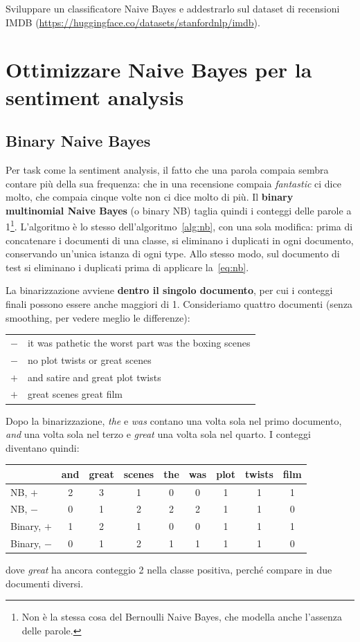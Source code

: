 \begin{esercizio}
Sviluppare un classificatore Naive Bayes e addestrarlo sul dataset di recensioni IMDB (\url{https://huggingface.co/datasets/stanfordnlp/imdb}).
\end{esercizio}

\section{Ottimizzare Naive Bayes per la sentiment analysis}
\subsection{Binary Naive Bayes}
Per task come la sentiment analysis, il fatto che una parola compaia sembra contare più della sua frequenza: che in una recensione compaia \textit{fantastic} ci dice molto, che compaia cinque volte non ci dice molto di più. Il \textbf{binary multinomial Naive Bayes} (o binary NB) taglia quindi i conteggi delle parole a 1\footnote{Non è la stessa cosa del Bernoulli Naive Bayes, che modella anche l'assenza delle parole.}. L'algoritmo è lo stesso dell'algoritmo~\ref{alg:nb}, con una sola modifica: prima di concatenare i documenti di una classe, si eliminano i duplicati in ogni documento, conservando un'unica istanza di ogni type. Allo stesso modo, sul documento di test si eliminano i duplicati prima di applicare la~\eqref{eq:nb}.

La binarizzazione avviene \textbf{dentro il singolo documento}, per cui i conteggi finali possono essere anche maggiori di 1. Consideriamo quattro documenti (senza smoothing, per vedere meglio le differenze):
\begin{center}
\begin{tabular}{cl}
$-$ & it was pathetic the worst part was the boxing scenes \\
$-$ & no plot twists or great scenes \\
$+$ & and satire and great plot twists \\
$+$ & great scenes great film \\
\end{tabular}
\end{center}
Dopo la binarizzazione, \textit{the} e \textit{was} contano una volta sola nel primo documento, \textit{and} una volta sola nel terzo e \textit{great} una volta sola nel quarto. I conteggi diventano quindi:
\begin{center}
\small
\begin{tabular}{l|cccccccc}
\toprule
 & and & great & scenes & the & was & plot & twists & film \\
\midrule
NB, $+$ & 2 & 3 & 1 & 0 & 0 & 1 & 1 & 1 \\
NB, $-$ & 0 & 1 & 2 & 2 & 2 & 1 & 1 & 0 \\
Binary, $+$ & 1 & 2 & 1 & 0 & 0 & 1 & 1 & 1 \\
Binary, $-$ & 0 & 1 & 2 & 1 & 1 & 1 & 1 & 0 \\
\bottomrule
\end{tabular}
\end{center}
dove \textit{great} ha ancora conteggio 2 nella classe positiva, perché compare in due documenti diversi.


